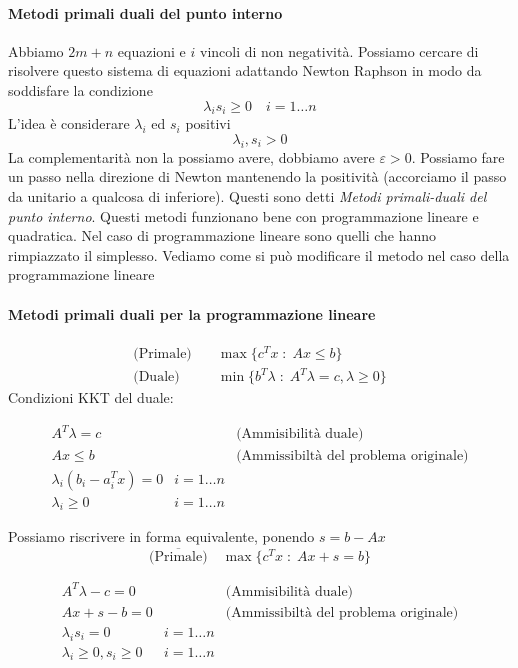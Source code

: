 \paragraph{Metodi primali duali del punto interno}
Abbiamo $2m + n$ equazioni e $i$ vincoli di non negativit\`a.
Possiamo cercare di risolvere questo sistema di equazioni
adattando Newton Raphson in modo da soddisfare la condizione
$$ \lambda_i s_i \geq 0 \quad i = 1 \ldots n $$
L'idea \`e considerare $\lambda_i$ ed $s_i$ positivi
$$ \lambda_i, s_i > 0$$
La complementarit\`a non la possiamo avere, dobbiamo avere $\varepsilon >
0 $. Possiamo fare un passo nella direzione di Newton mantenendo la
positivit\`a (accorciamo il passo da unitario a qualcosa di
inferiore). Questi sono detti \emph{Metodi primali-duali del punto
interno}.  Questi metodi funzionano bene con programmazione lineare e
quadratica.  Nel caso di programmazione lineare sono quelli che hanno
rimpiazzato il simplesso. Vediamo come si pu\`o modificare il metodo
nel caso della programmazione lineare
\paragraph{Metodi primali duali per la programmazione lineare}
 $$
\begin{array}{ll}
\text{(Primale)} \quad &  \max \{c^{T}x \; : \; Ax  \leq b \} \\
 \text{(Duale)}  &  \min \{ b^{T} \lambda \; : \; A^{T}\lambda = c ,
                          \lambda \geq 0 \}
\end{array}
$$
Condizioni KKT del duale:
\begin{center}
\fbox
{
 \begin{minipage}[position]{0.75\textwidth}
$$
\begin{array}{lll}
A^{T}\lambda = c & & \text{(Ammisibilit\`a duale)}  \\
 Ax \leq b & &  \text{(Ammissibilt\`a del problema originale)} \\
 \lambda_i (b_i - a_i^{T}x) = 0 & i=1\ldots n & \\
 \lambda_i \geq 0 & i=1\ldots n  &
\end{array}
$$
\end{minipage}
}
\end{center}

Possiamo riscrivere in forma equivalente, ponendo $s=b-Ax$
$$ \overline{\text{(Primale)}} \quad   \max \{c^{T}x \; : \; Ax +s =  b \}$$

\begin{center}
\fbox
{
 \begin{minipage}[position]{0.75\textwidth}
$$
\begin{array}{lll}
A^{T}\lambda  -c = 0 & & \text{(Ammisibilit\`a duale)}  \\
 Ax +s - b = 0 & &  \text{(Ammissibilt\`a del problema originale)} \\
 \lambda_i  s_i = 0 & i=1\ldots n & \\
 \lambda_i \geq 0, s_i \geq 0 & i=1\ldots n  &
\end{array}
$$
\end{minipage}
}
\end{center}

